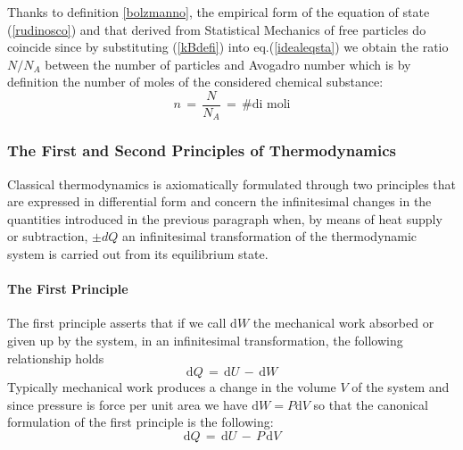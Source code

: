 \documentclass[10pt,a4paper]{article}
\begin{document}
Thanks to definition \ref{bolzmanno}, the empirical form of the equation of state
(\ref{rudinosco}) and that derived from Statistical Mechanics of free particles
do coincide since by substituting (\ref{kBdefi}) into eq.(\ref{idealeqsta})
we obtain the ratio $N/N_A$ between the number of particles and Avogadro number
which is by definition the number of moles of the considered chemical substance:
\begin{equation}\label{numolosso}
    n \, = \, \frac{N}{N_A} \, = \,  \text{\# di moli}
\end{equation}
\subsubsection{The First and Second Principles of  Thermodynamics}
\label{principiale} Classical thermodynamics is axiomatically formulated through two principles that are expressed in differential form and concern the infinitesimal changes in the quantities introduced in the previous paragraph when, by means of heat supply or subtraction, $\pm dQ$  an infinitesimal transformation of the thermodynamic system is carried out from its equilibrium state.
\paragraph{\sc The First Principle} The first principle asserts that if we call $\mathrm{d}W$
the mechanical work absorbed or given up by the system, in an infinitesimal transformation, the following relationship holds
\begin{equation}\label{principiumprimum}
    \mathrm{d}Q\,=\, \mathrm{d}U \, - \, \mathrm{d}W
\end{equation}
Typically mechanical work produces a change in the volume $V$ of the system and since pressure is force per unit area we have
  $\mathrm{d}W=P\mathrm{d}V$ so that the canonical formulation of the first principle is the following:
\begin{equation}\label{principiumprimumcan}
    \mathrm{d}Q\,=\, \mathrm{d}U \, - \, P\, \mathrm{d}V
\end{equation}
\end{document}

